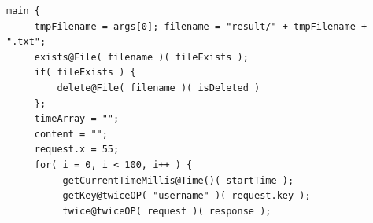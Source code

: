 \documentclass[12pt,a4paper]{article}
\begin{document}
\begin{appendices}
\begin{lstlisting}[caption={Example service client},label={lst:exampleServiceClient}]
main {                                                                                                                                                                                                       
     tmpFilename = args[0]; filename = "result/" + tmpFilename + ".txt";                                                                                                                                                            
     exists@File( filename )( fileExists );                                                                                                                                                                  
     if( fileExists ) {                                                                                                                                                                                      
         delete@File( filename )( isDeleted )                                                                                                                                                                
     };                                                                                                                                                                                                      
     timeArray = "";                                                                                                                                                                                         
     content = "";                                                                                                                                                                                           
     request.x = 55;                                                                                                                                                                                         
     for( i = 0, i < 100, i++ ) {                                                                                                                                                                            
          getCurrentTimeMillis@Time()( startTime );                                                                                                                                                          
          getKey@twiceOP( "username" )( request.key );                                                                                                                                                       
          twice@twiceOP( request )( response );                                                                                                                                                              

\end{lstlisting}
\end{appendices}
\end{document}
